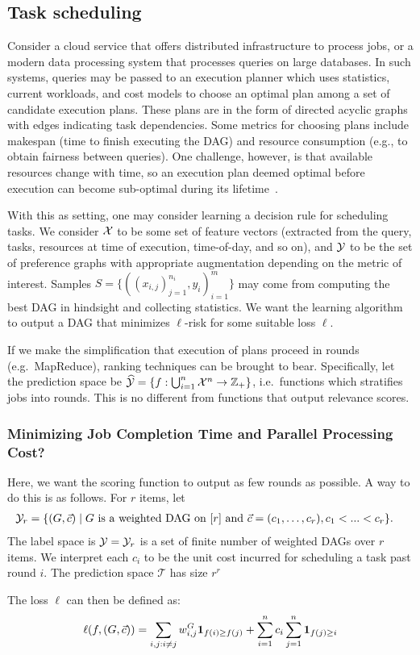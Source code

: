 
\subsection{Task scheduling}
Consider a cloud service that offers distributed infrastructure to process
jobs, or a modern data processing system that processes queries on large
databases.
In such systems, queries may be passed to an execution planner
which uses statistics, current workloads, and cost models to choose an optimal
plan among a set of candidate execution plans.
These plans are in the form of directed acyclic graphs with edges indicating
task dependencies.
Some metrics for choosing plans include makespan (time to finish executing
the DAG) and resource consumption (e.g., to obtain fairness between queries).
One challenge, however, is that available resources change with time,
so an execution plan deemed optimal before execution can become sub-optimal
during its lifetime~\cite{mahajan2018qoop}.

With this as setting, one may consider learning a decision rule for
scheduling tasks.
We consider ${\mathcal X}$ to be some set of feature vectors
(extracted from the query, tasks, resources at time of execution,
time-of-day, and so on), and ${\mathcal Y}$ to be the set of preference graphs with
appropriate augmentation depending on the metric of interest. Samples
$S = \{((x_{i,j})_{j=1}^{n_i}, y_i)_{i=1}^m\}$ may come from computing the best DAG
in hindsight and collecting statistics. We want the learning algorithm to
output a DAG that minimizes $\ell$-risk for some suitable loss $\ell$.

If we make the simplification that execution of plans proceed in rounds (e.g.\
MapReduce), ranking techniques can be brought to bear. Specifically,
let the prediction space be
$\widehat{\mathcal{Y}} = \{f: \bigcup_{i=1}^n {\mathcal X}^n \to \mathbb{Z}_+\}$,
i.e.\ functions which stratifies jobs into rounds. This is no different from
functions that output relevance scores.

\subsubsection{Minimizing Job Completion Time and Parallel Processing Cost?}
Here, we want the scoring function to output as few rounds as possible.
A way to do this is as follows. For $r$ items, let
\begin{align*}
  {\mathcal Y}_r &= \{ (G, \vec{c})
  \mid \text{$G$ is a weighted DAG on $[r]$ and $\vec{c} =( c_1, \ldots, c_r), c_1< ...< c_r$}
  \}.
\end{align*}
The label space is ${\mathcal Y} = {\mathcal Y}_r$ is a set of finite number of weighted DAGs
over $r$ items. We interpret each $c_i$
to be the unit cost incurred for scheduling a task past round $i$.
The prediction space $\mathcal{T}$ has size $r^r$

The loss $\ell$ can then be defined as:
\begin{align*}
  \ell(f, (G, \vec{c}))
  = \sum_{i,j: i \neq j} w_{i,j}^G {\mathbf 1}_{f(i) \geq f(j)}
  + \sum_{i=1}^n c_i \sum_{j=1}^n {\mathbf 1}_{f(j) \geq i}
\end{align*}








